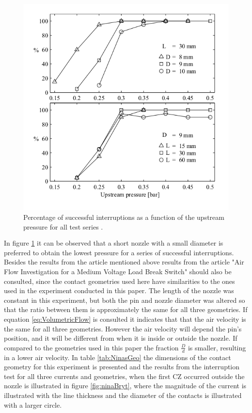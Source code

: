 \documentclass[10pt,a4paper,twoside]{article}
\begin{document}
\begin{figure}[H]
  \centering
  \includegraphics[scale=0.5]{Bilder/Discussion/percentSuccMVLBS.png}
  \caption{Percentage of successful interruptions as a function of the upstream pressure for all test series \cite{bib:CIAMVLBS}.}
  \label{fig:resultsCIMALBS}
\end{figure}

In figure \ref{fig:resultsCIMALBS} it can be observed that a short nozzle with a small diameter is preferred to obtain the lowest pressure for a series of successful interruptions. Besides the results from the article mentioned above results from the article "Air Flow Investigation for a Medium Voltage Load Break Switch" \cite{bib:AFIMVLBA} should also be consulted, since the contact geometries used here have similarities to the ones used in the experiment conducted in this paper. The length of the nozzle was constant in this experiment, but both the pin and nozzle diameter was altered so that the ratio between them is approximately the same for all three geometries. If equation \eqref{eq:VolumetricFlow} is consulted it indicates that that the air velocity is the same for all three geometries. However the air velocity will depend the pin's position, and it will be different from when it is inside or outside the nozzle. If compared to the geometries used in this paper the fraction $\frac{D}{d}$ is smaller, resulting in a lower air velocity. In table \ref{tab:NinasGeo} the dimensions of the contact geometry for this experiment is presented and the results from the interruption test for all three currents and geometries, when the first CZ occurred outside the nozzle is illustrated in figure \ref{fig:ninaBryt}, where the magnitude of the current is illustrated with the line thickness and the diameter of the contacts is illustrated with a larger circle.
\end{document}
